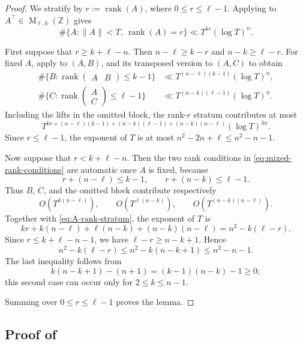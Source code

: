 \documentclass[reqno,11pt]{amsart}
\numberwithin{equation}{section}
\theoremstyle{definition}
\theoremstyle{remark}
\newcommand{\op}{\operatorname}
\newcommand{\rank}{\op{rank}}
\newcommand{\M}{\op{M}}
\begin{document}
\begin{proof}
We stratify by $r:=\rank(A)$, where $0\le r\le\ell-1$. Applying
 to $A^{\intercal}\in\M_{\ell,k}(\mathbb Z)$
gives
\begin{equation}\label{eq:A-rank-stratum}
\#\{A:\|A\|< T,\ \rank(A)=r\}
\ll
T^{kr}(\log T)^n.
\end{equation}

First suppose that $r\ge k+\ell-n$. Then $n-\ell\ge k-r$ and
$n-k\ge\ell-r$. For fixed $A$, apply  to $(A,B)$, and
its transposed version to $(A,C)$ to obtain
$$\begin{aligned}
    \#\{B: \rank\begin{pmatrix}A&B\end{pmatrix}\le k-1\}
&\ll
T^{(n-\ell)(k-1)}(\log T)^n,\\\#\{C:\rank\begin{pmatrix}A\\ C\end{pmatrix}\leq\ell-1\}
&\ll
T^{(n-k)(\ell-1)}(\log T)^n.
\end{aligned}$$
Including the lifts in the omitted block, the rank-$r$ stratum contributes
at most
$$
T^{kr+(n-\ell)(k-1)+(n-k)(\ell-1)+(n-k)(n-\ell)}(\log T)^{3n}.
$$
Since $r\le\ell-1$, the exponent of $T$ is at most $n^2-2n+\ell
\le
n^2-n-1$.

Now suppose that $r<k+\ell-n$. Then the two rank conditions in
\eqref{eq:mixed-rank-conditions} are automatic once $A$ is fixed, because
$$
r+(n-\ell)\le k-1,
\qquad
r+(n-k)\le\ell-1.
$$
Thus $B$, $C$, and the omitted block contribute respectively
$$
O(T^{k(n-\ell)}),
\qquad
O(T^{\ell(n-k)}),
\qquad
O(T^{(n-k)(n-\ell)}).
$$
Together with \eqref{eq:A-rank-stratum}, the exponent of $T$ is
$$
kr+k(n-\ell)+\ell(n-k)+(n-k)(n-\ell)
=
n^2-k(\ell-r).
$$
Since $r\le k+\ell-n-1$, we have $\ell-r\ge n-k+1$. Hence
$$
n^2-k(\ell-r)
\le
n^2-k(n-k+1)
\le
n^2-n-1.
$$
The last inequality follows from
$$
k(n-k+1)-(n+1)=(k-1)(n-k)-1\ge0;
$$
this second case can occur only for $2\le k\le n-1$.

Summing over $0\le r\le\ell-1$ proves the lemma.
\end{proof}

\subsection{Proof of }
\end{document}
